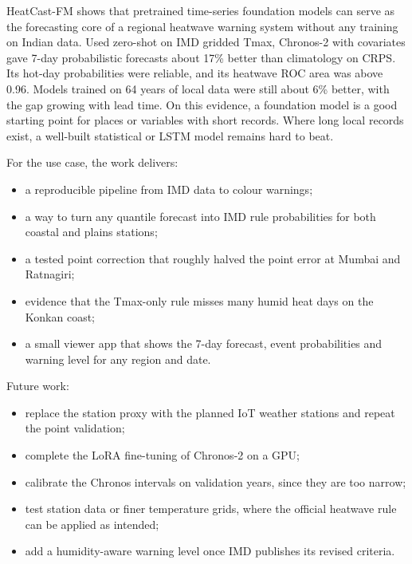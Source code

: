 HeatCast-FM shows that pretrained time-series foundation models can serve as the forecasting core of a regional heatwave warning system without any training on Indian data. Used zero-shot on IMD gridded Tmax, Chronos-2 with covariates gave 7-day probabilistic forecasts about 17\% better than climatology on CRPS. Its hot-day probabilities were reliable, and its heatwave ROC area was above 0.96. Models trained on 64 years of local data were still about 6\% better, with the gap growing with lead time. On this evidence, a foundation model is a good starting point for places or variables with short records. Where long local records exist, a well-built statistical or LSTM model remains hard to beat.

For the use case, the work delivers:
\begin{itemize}
\item a reproducible pipeline from IMD data to colour warnings;
\item a way to turn any quantile forecast into IMD rule probabilities for both coastal and plains stations;
\item a tested point correction that roughly halved the point error at Mumbai and Ratnagiri;
\item evidence that the Tmax-only rule misses many humid heat days on the Konkan coast;
\item a small viewer app that shows the 7-day forecast, event probabilities and warning level for any region and date.
\end{itemize}

Future work:
\begin{itemize}
\item replace the station proxy with the planned IoT weather stations and repeat the point validation;
\item complete the LoRA fine-tuning of Chronos-2 on a GPU;
\item calibrate the Chronos intervals on validation years, since they are too narrow;
\item test station data or finer temperature grids, where the official heatwave rule can be applied as intended;
\item add a humidity-aware warning level once IMD publishes its revised criteria.
\end{itemize}

